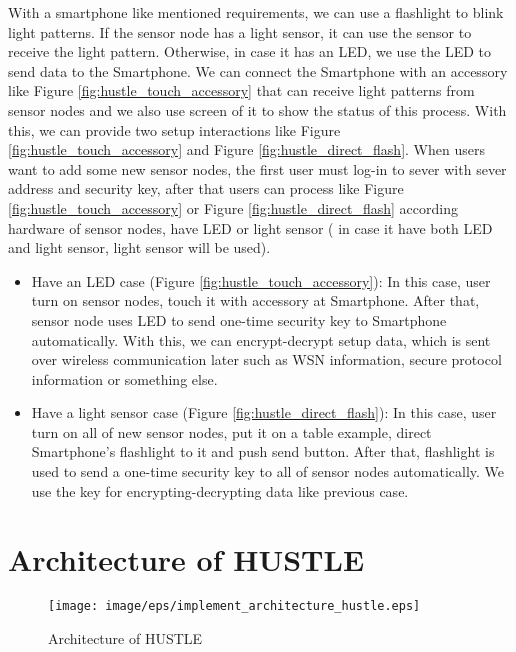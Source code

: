 With a smartphone like mentioned requirements, we can use a flashlight to blink light patterns. If the sensor node has a light sensor, it can use the sensor to receive the light pattern. Otherwise, in case it has an LED, we use the LED to send data to the Smartphone. We can connect the Smartphone with an accessory like Figure \ref{fig:hustle_touch_accessory} that can receive light patterns from sensor nodes and we also use screen of it to show the status of this process. With this, we can provide two setup interactions like Figure \ref{fig:hustle_touch_accessory} and Figure \ref{fig:hustle_direct_flash}. When users want to add some new sensor nodes, the first user must log-in to sever with sever address and security key, after that users can process like Figure \ref{fig:hustle_touch_accessory} or Figure \ref{fig:hustle_direct_flash} according hardware of sensor nodes, have LED or light sensor ( in case it have both LED and light sensor, light sensor will be used).

\begin{itemize}
\item Have an LED case (Figure \ref{fig:hustle_touch_accessory}): In this case, user turn on sensor nodes, touch it with accessory at Smartphone. After that, sensor node uses LED to send one-time security key to Smartphone automatically. With this, we can encrypt-decrypt setup data, which is sent over wireless communication later such as WSN information, secure protocol information or something else.
\item Have a light sensor case (Figure \ref{fig:hustle_direct_flash}): In this case, user turn on all of new sensor nodes, put it on a table example, direct Smartphone's flashlight to it and push send button. After that, flashlight is used to send a one-time security key to all of sensor nodes automatically. We use the key for encrypting-decrypting data like previous case.
\end{itemize}

\section{Architecture of HUSTLE}

\begin{figure}[tb]
\centering
\texttt{[image: image/eps/implement\_architecture\_hustle.eps]}
\caption{Architecture of HUSTLE}
\label{fig:implement_architechture}
\end{figure}

